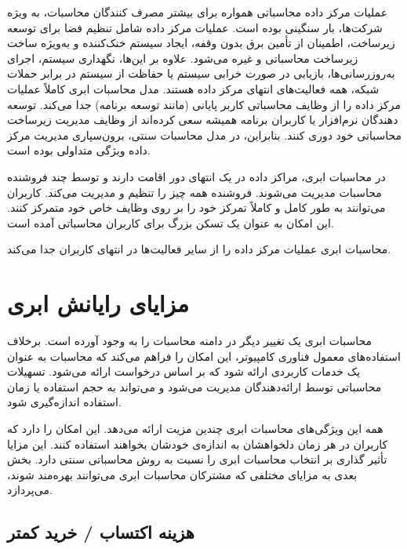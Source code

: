 \documentclass{book}
\begin{document}
            عملیات مرکز داده محاسباتی همواره برای بیشتر مصرف کنندگان محاسبات، به ویژه شرکت‌ها، بار سنگینی بوده است. عملیات مرکز داده شامل تنظیم فضا برای توسعه زیرساخت، اطمینان از تأمین برق بدون وقفه، ایجاد سیستم خنک‌کننده و به‌ویژه ساخت زیرساخت محاسباتی و غیره می‌شود. علاوه بر این‌ها، نگهداری سیستم، اجرای به‌روزرسانی‌ها، بازیابی در صورت خرابی سیستم یا حفاظت از سیستم در برابر حملات شبکه، همه فعالیت‌های انتهای مرکز داده هستند. مدل محاسبات ابری کاملاً عملیات مرکز داده را از وظایف محاسباتی کاربر پایانی (مانند توسعه برنامه) جدا می‌کند. توسعه دهندگان نرم‌افزار یا کاربران برنامه همیشه سعی کرده‌اند از وظایف مدیریت زیرساخت محاسباتی خود دوری کنند. بنابراین، در مدل محاسبات سنتی، برون‌سپاری مدیریت مرکز داده ویژگی متداولی بوده است.

            در محاسبات ابری، مراکز داده در یک انتهای دور اقامت دارند و توسط چند فروشنده محاسبات مدیریت می‌شوند. فروشنده همه چیز را تنظیم و مدیریت می‌کند. کاربران می‌توانند به طور کامل و کاملاً تمرکز خود را بر روی وظایف خاص خود متمرکز کنند. این امکان به عنوان یک تسکن بزرگ برای کاربران محاسباتی آمده است.

            \begin{addinfo}
                
                محاسبات ابری عملیات مرکز داده را از سایر فعالیت‌ها در انتهای کاربران جدا می‌کند.

            \end{addinfo}

        \section{مزایای رایانش ابری}

            محاسبات ابری یک تغییر دیگر در دامنه محاسبات را به وجود آورده است. برخلاف استفاده‌های معمول فناوری کامپیوتر، این امکان را فراهم می‌کند که محاسبات به عنوان یک خدمات کاربردی ارائه شود که بر اساس درخواست ارائه می‌شود. تسهیلات محاسباتی توسط ارائه‌دهندگان مدیریت می‌شود و می‌تواند به حجم استفاده یا زمان استفاده اندازه‌گیری شود.

            همه این ویژگی‌های محاسبات ابری چندین مزیت ارائه می‌دهد. این امکان را دارد که کاربران در هر زمان دلخواهشان به اندازه‌ی خودشان بخواهند استفاده کنند. این مزایا تأثیر گذاری بر انتخاب محاسبات ابری را نسبت به روش محاسباتی سنتی دارد. بخش بعدی به مزایای مختلفی که مشترکان محاسبات ابری می‌توانند بهره‌مند شوند، می‌پردازد.

            \subsection{هزینه اکتساب / خرید کمتر}
\end{document}
